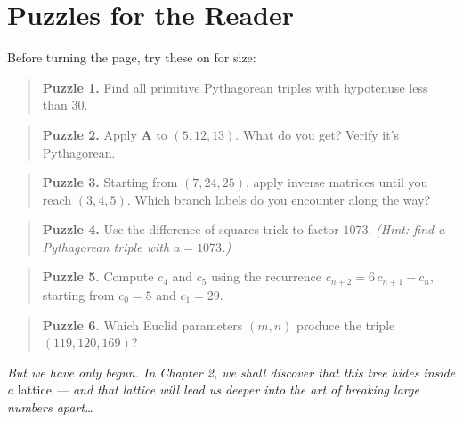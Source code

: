 \section{Puzzles for the Reader}\label{ch1-puzzles-for-the-reader}

Before turning the page, try these on for size:

\begin{quote}
\textbf{Puzzle 1.} Find all primitive Pythagorean triples with hypotenuse less than \(30\).
\end{quote}

\begin{quote}
\textbf{Puzzle 2.} Apply \(\mathbf{A}\) to \((5, 12, 13)\). What do you get? Verify it's Pythagorean.
\end{quote}

\begin{quote}
\textbf{Puzzle 3.} Starting from \((7, 24, 25)\), apply inverse matrices until you reach \((3, 4, 5)\). Which branch labels do you encounter along the way?
\end{quote}

\begin{quote}
\textbf{Puzzle 4.} Use the difference-of-squares trick to factor \(1073\). \emph{(Hint: find a Pythagorean triple with \(a = 1073\).)}
\end{quote}

\begin{quote}
\textbf{Puzzle 5.} Compute \(c_4\) and \(c_5\) using the recurrence \(c_{n+2} = 6\,c_{n+1} - c_n\), starting from \(c_0 = 5\) and \(c_1 = 29\).
\end{quote}

\begin{quote}
\textbf{Puzzle 6.} Which Euclid parameters \((m, n)\) produce the triple \((119, 120, 169)\)?
\end{quote}



\emph{But we have only begun. In Chapter 2, we shall discover that this tree hides inside a} lattice \emph{--- and that lattice will lead us deeper into the art of breaking large numbers apart\ldots{}}
